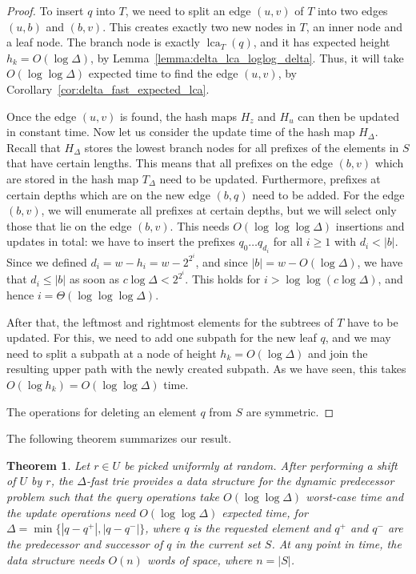 \documentclass[a4paper,11pt]{article}
\newtheorem{theorem}{Theorem}[section]
\newcommand{\?}{\mskip1.5mu}
\DeclareMathOperator{\lca}{lca} %
\begin{document}
\begin{proof}
To insert $q$ into $T$, we need to split an edge $(u,v)$ of $T$ into
two edges $(u,b)$ and $(b,v)$. This creates
exactly two new nodes in $T$, an inner node and a leaf node. 
The branch node is exactly $\lca_T(q)$, and it has expected height 
$h_k = O(\log \Delta)$, by Lemma~\ref{lemma:delta_lca_loglog_delta}. 
Thus, it will
take $O(\log\log \Delta)$ expected time to find
the edge $(u,v)$, by
Corollary~\ref{cor:delta_fast_expected_lca}.

Once the edge $(u,v)$ is found, the hash maps $H_z$ and $H_u$ 
can then be updated in constant time.
Now let us consider the update time of the 
hash map $H_\Delta$. Recall that
$H_\Delta$ stores the lowest branch nodes for all prefixes
of the elements in $S$ that have certain lengths.
This means that all prefixes on the edge $(b,v)$ which 
are stored in the hash map $T_\Delta$ need to
be updated. Furthermore, prefixes at certain depths which 
are on the new edge $(b,q)$ need to
be added. For the edge $(b,v)$, we will enumerate 
all prefixes at certain depths, but we will select only those that 
lie on the edge $(b,v)$. This needs
$O(\log\log\log\Delta)$ insertions and updates in total: we
have to insert the prefixes $q_0 \dots q_{d_i}$ for all 
$i \geq 1$ with $d_i < |b|$. Since we defined 
$d_i = w - h_i = w - 2^{2^i}$, 
and since $|b| = w - O(\log \Delta)$, 
we have that $d_i \leq |b|$ as soon as 
$c \log\Delta < 2^{2^i}$. This holds for 
$i > \log\log (c\log \Delta)$, and hence $i =
\Theta(\log\log\log\Delta)$.

After that, the leftmost and rightmost elements for the subtrees
of $T$ have to be updated. For this, we need to add one
subpath for the new leaf $q$, and we may need to split
a subpath at a node of height $h_k = O(\log \Delta)$ and join
the resulting upper path with the newly created subpath. As we
have seen, this takes $O(\log h_k) = O(\log \log \Delta)$ time.

The operations for deleting an element $q$ from $S$ are symmetric.
\end{proof}

The following theorem summarizes our result.

\begin{theorem}
Let $r \in U$ be picked uniformly at random.
After performing a shift of $U$ by $r$, 
the $\Delta$-fast trie provides a data structure for the
dynamic predecessor problem such that the 
query operations take $O(\log \log \Delta)$ worst-case time and 
the update operations need $O(\log \log \Delta)$ expected
time, for $\Delta = \min \{|q-q^+|, |q-q^-|\}$, where $q$ is the
requested element and $q^+$ and $q^-$ are the predecessor and
successor of $q$ in the current set $S$. At any point in time, 
the data structure needs $O(n)$ words of space, where $n = |S|$.
\end{theorem}
\end{document}

